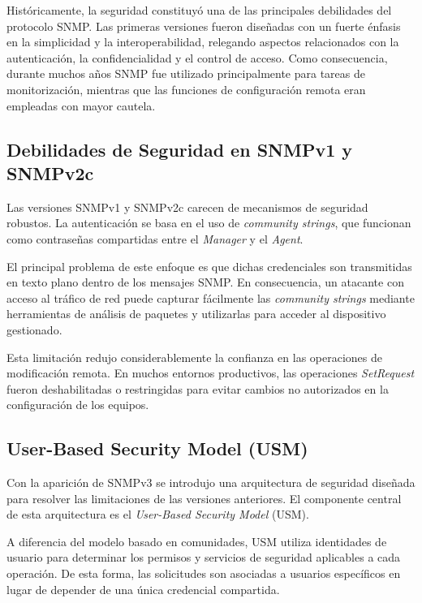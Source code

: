 Históricamente, la seguridad constituyó una de las principales debilidades del protocolo SNMP. Las primeras versiones fueron diseñadas con un fuerte énfasis en la simplicidad y la interoperabilidad, relegando aspectos relacionados con la autenticación, la confidencialidad y el control de acceso. Como consecuencia, durante muchos años SNMP fue utilizado principalmente para tareas de monitorización, mientras que las funciones de configuración remota eran empleadas con mayor cautela.

\subsection{Debilidades de Seguridad en SNMPv1 y SNMPv2c}

Las versiones SNMPv1 y SNMPv2c carecen de mecanismos de seguridad robustos. La autenticación se basa en el uso de \textit{community strings}, que funcionan como contraseñas compartidas entre el \textit{Manager} y el \textit{Agent}.

El principal problema de este enfoque es que dichas credenciales son transmitidas en texto plano dentro de los mensajes SNMP. En consecuencia, un atacante con acceso al tráfico de red puede capturar fácilmente las \textit{community strings} mediante herramientas de análisis de paquetes y utilizarlas para acceder al dispositivo gestionado.

Esta limitación redujo considerablemente la confianza en las operaciones de modificación remota. En muchos entornos productivos, las operaciones \textit{SetRequest} fueron deshabilitadas o restringidas para evitar cambios no autorizados en la configuración de los equipos.

\subsection{User-Based Security Model (USM)}

Con la aparición de SNMPv3 se introdujo una arquitectura de seguridad diseñada para resolver las limitaciones de las versiones anteriores. El componente central de esta arquitectura es el \textit{User-Based Security Model} (USM).

A diferencia del modelo basado en comunidades, USM utiliza identidades de usuario para determinar los permisos y servicios de seguridad aplicables a cada operación. De esta forma, las solicitudes son asociadas a usuarios específicos en lugar de depender de una única credencial compartida.

